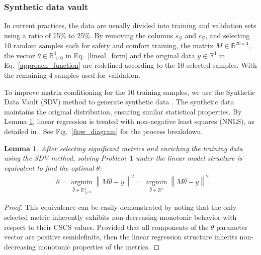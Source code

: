 \documentclass[lettersize,journal]{IEEEtran}
\newtheorem{lemma}{Lemma}
\begin{document}
\subsubsection{Synthetic data vault}
In current practices, the data are usually divided into training and validation sets using a ratio of 75\% to 25\%.
By removing the columns $s_{\mathcal{G}}$ and $c_{\mathcal{G}}$, and selecting 10 random samples each for safety and comfort training, the matrix $M \in \mathbb{R}^{20 \times 4}$, the vector $\theta \in \mathbb{R}_{>0}^4$ in Eq.~\eqref{lineal_form} and the original data $y \in \mathbb{R}^{4}$ in Eq.~\eqref{approach_function} are redefined according to the $10$ selected samples. With the remaining 4 samples used for validation. 


To improve matrix conditioning for the 10 training samples, we use the Synthetic Data Vault (SDV) method to generate synthetic data \cite{7796926}. The synthetic data maintains the original distribution, ensuring similar statistical properties. By Lemma \ref{lema_nnls}, linear regression is treated with non-negative least squares (NNLS), as detailed in \cite{lawson1995solving}. See Fig.~\ref{flow_diagram} for the process breakdown.


\begin{lemma}
\label{lema_nnls}
After selecting significant metrics and enriching the training data using the SDV method, solving Problem~$1$ under the linear model structure is equivalent to find the optimal $\tilde{\theta}$:
\begin{align}
        \label{min_nnlss}
        &  \tilde{\theta} = \underset{\hat{\theta} \in \mathbb{R}_{\geq 0}^4}{\operatorname{argmin}}  \left\|  M \hat{\theta} - y \right\|^2  = \underset{\hat{\theta} \in \mathbb{R}^4}{\operatorname{argmin}}  \left\|  M \hat{\theta} - y \right\|^2. 
   \end{align}
\end{lemma}
%
\begin{proof} This equivalence can be easily demonstrated by noting that the only selected metric inherently exhibits non-decreasing monotonic behavior with respect to their CSCS values. Provided that all components of the $\theta$ parameter vector are positive semidefinite, then the linear regression structure inherits non-decreasing monotonic properties of the metrics. 
\end{proof}
\end{document}
